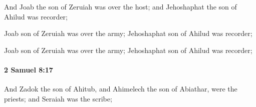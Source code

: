 			\begin{versebox}
					\item[BHS] 
					\item[ASV] And Joab the son of Zeruiah was over the host; and Jehoshaphat the son of Ahilud was recorder;
					\item[NIV] Joab son of Zeruiah was over the army; Jehoshaphat son of Ahilud was recorder;
					\item[NRSV] Joab son of Zeruiah was over the army; Jehoshaphat son of Ahilud was recorder;
			\end{versebox}

		\paragraph{2 Samuel 8:17} %
			\label{2SAMUEL-8-17}

			And Zadok the son of Ahitub, and Ahimelech the son of Abiathar, were the priests; and Seraiah was the scribe;

